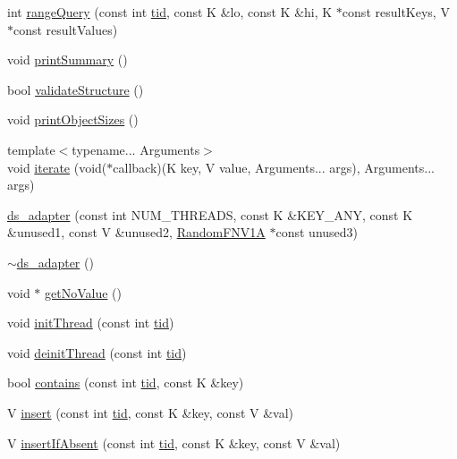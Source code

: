 \begin{DoxyCompactItemize}
int \hyperlink{classds__adapter_a23a9c8db5425e98a93d647df1c6c23dd}{range\+Query} (const int \hyperlink{microbench_2main_8cpp_a9ca9869868fe7e7a38a921cc7de4103f}{tid}, const K \&lo, const K \&hi, K $\ast$const result\+Keys, V $\ast$const result\+Values)
\item 
void \hyperlink{classds__adapter_aac97293215557665d2ef1e1a0d06fcfd}{print\+Summary} ()
\item 
bool \hyperlink{classds__adapter_ae50fe8a8683c0278cdd4c45e1405860d}{validate\+Structure} ()
\item 
void \hyperlink{classds__adapter_a33b13b7059a8c0345fb59a324dc3a691}{print\+Object\+Sizes} ()
\item 
{\footnotesize template$<$typename... Arguments$>$ }\\void \hyperlink{classds__adapter_ab1e0bb9a9b403ba68e85bf53219b1368}{iterate} (void($\ast$callback)(K key, V value, Arguments... args), Arguments... args)
\item 
\hyperlink{classds__adapter_a553e7a145bf0cdfb14cb9dc25eec03d3}{ds\+\_\+adapter} (const int N\+U\+M\+\_\+\+T\+H\+R\+E\+A\+DS, const K \&K\+E\+Y\+\_\+\+A\+NY, const K \&unused1, const V \&unused2, \hyperlink{classRandomFNV1A}{Random\+F\+N\+V1A} $\ast$const unused3)
\item 
\hyperlink{classds__adapter_a366f46dd39d59f2d4a147589f5fd98e3}{$\sim$ds\+\_\+adapter} ()
\item 
void $\ast$ \hyperlink{classds__adapter_adb631e454b8146520f601d1a86c6c72c}{get\+No\+Value} ()
\item 
void \hyperlink{classds__adapter_a3733f6a6b57312b1b5e4fb5181d82a0b}{init\+Thread} (const int \hyperlink{microbench_2main_8cpp_a9ca9869868fe7e7a38a921cc7de4103f}{tid})
\item 
void \hyperlink{classds__adapter_a173ca48b19fc1dc346159ea582c690cd}{deinit\+Thread} (const int \hyperlink{microbench_2main_8cpp_a9ca9869868fe7e7a38a921cc7de4103f}{tid})
\item 
bool \hyperlink{classds__adapter_aecf1899dbe9fae93c72ee2b5549cf6eb}{contains} (const int \hyperlink{microbench_2main_8cpp_a9ca9869868fe7e7a38a921cc7de4103f}{tid}, const K \&key)
\item 
V \hyperlink{classds__adapter_a6c0fc676d77e30e14946baf325174739}{insert} (const int \hyperlink{microbench_2main_8cpp_a9ca9869868fe7e7a38a921cc7de4103f}{tid}, const K \&key, const V \&val)
\item 
V \hyperlink{classds__adapter_ae9cb29ad0c0338c0e1d12ef97e008135}{insert\+If\+Absent} (const int \hyperlink{microbench_2main_8cpp_a9ca9869868fe7e7a38a921cc7de4103f}{tid}, const K \&key, const V \&val)

\end{DoxyCompactItemize}
